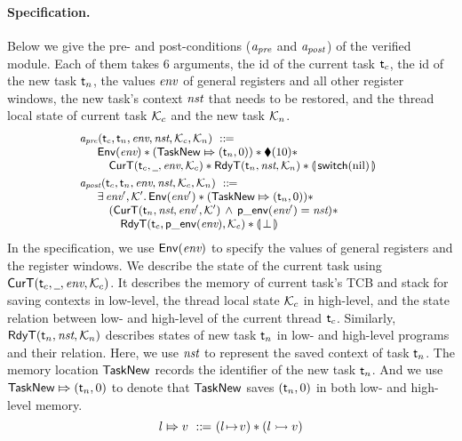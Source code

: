 \paragraph{\textbf{Specification.}}
Below we give the pre- and post-conditions
($\textit{a}_\textit{pre}$ and $\textit{a}_\textit{post}$) of the verified module.
Each of them takes 6 arguments, 
the id of the current task $\textsf{t}_c$, the id of the new 
task $\textsf{t}_n$, the values $\textit{env}$ of general registers and all
other register windows, the new task's context $\textit{nst}$
that needs to be restored, and the thread local state 
of current task $\mathcal{K}_c$ and the new task 
$\mathcal{K}_n$.  
\[
    \small
    \begin{array}{l}
        \textit{a}_\textit{pre}(\textsf{t}_c, \textsf{t}_n, \textit{env}, \textit{nst}, \mathcal{K}_c, \mathcal{K}_n)
        \ ::\!\!{=} \\
        \quad
        \begin{array}{l}
            \mathsf{Env}({\textit{env}}) *
            ({\mathsf{TaskNew}}\Mapsto{(\textsf{t}_n, 0)}) * 
            \blacklozenge({10}) * \\
            \quad
            \textsf{CurT}({\textsf{t}_c}, {\underline{\ \,}}, {\textit{env}}, {\mathcal{K}_c}) * 
            \textsf{RdyT}({\textsf{t}_n}, {\textit{nst}}, {\mathcal{K}_n}) * 
            \llparenthesis {\, \mathsf{switch}(\text{nil}) \,} \rrparenthesis
        \end{array}
        \\
        \\[-8pt]
        \textit{a}_\textit{post}(\textsf{t}_c, \textsf{t}_n, \textit{env}, \textit{nst}, \mathcal{K}_c, \mathcal{K}_n)
        \ ::\!\!{=} \\ 
        \quad
        \begin{array}{l}
            \exists \, \textit{env}', \mathcal{K}'. \, \mathsf{Env}({\textit{env}'}) 
            * ({\mathsf{TaskNew}}\Mapsto{(\textsf{t}_n, 0)}) 
            * \
            \\
            \quad
            (\textsf{CurT}({\textsf{t}_n}, {\textit{nst}}, {\textit{env}'}, {\mathcal{K}'})
            \,\land\,\mathsf{p\_env}({\textit{env}'}) = \textit{nst}) * 
            \\
            \qquad
            \textsf{RdyT}({\textsf{t}_c}, {\mathsf{p\_env}({\textit{env}})}, {\mathcal{K}_c}) * 
            \llparenthesis {\, \perp\,} \rrparenthesis
        \end{array}
    \end{array}
\]
In the specification,
we use $\mathsf{Env}({\textit{env}})$ to specify the values of
general registers and the register windows.
We describe the state
of the current task 
using $\textsf{CurT}({\textsf{t}_c}, {\underline{\ \,}}, {\textit{env}}, {\mathcal{K}_c})$. 
It describes the memory of current task's TCB 
and stack for saving contexts in low-level, 
the thread local state $\mathcal{K}_c$ in high-level, 
and the state relation between low- 
and high-level of the current thread $\textsf{t}_c$.  
Similarly, $\textsf{RdyT}({\textsf{t}_n}, {\textit{nst}}, {\mathcal{K}_n})$  
describes states of new task $\textsf{t}_n$ in low- and high-level 
programs and their relation. 
Here, we use $\textit{nst}$ to represent the saved context 
of task $\textsf{t}_n$. The memory location 
$\mathsf{TaskNew}$ records the identifier of the new task $\textsf{t}_n$.  
And we use ${\mathsf{TaskNew}}\Mapsto{(\textsf{t}_n, 0)}$ to denote that
$\mathsf{TaskNew}$ saves $(\textsf{t}_n, 0)$ 
in both low- and high-level memory. 
\[
    \relmsto{\loc}{\val} \ \define \ 
    (\msto{\loc}{\val}) \sepstar (\hmsto{\loc}{\val})
\]

